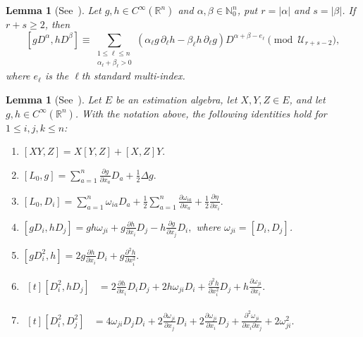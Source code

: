 \documentclass{tCON2e}
\newenvironment{revision}{\begingroup\color{black}}{\endgroup}
\numberwithin{equation}{section}
\theoremstyle{journalplain}
\newtheorem{lemma}[theorem]{Lemma}
\theoremstyle{journaldef}
\newenvironment{revision}{}{}
\begin{document}
\begin{revision}
\begin{lemma}[See~\citep{Wu2006Classification}]\label{lem:operator-products-symbols}
Let $g,h\in C^\infty(\mathbb R^n)$ and
$\alpha,\beta\in\mathbb N_0^n$, put $r=|\alpha|$ and $s=|\beta|$. If $r+s\geq2$, then
\[
[gD^\alpha,hD^\beta]
\equiv
\sum_{\substack{1\leq\ell\leq n\\
                 \alpha_\ell+\beta_\ell>0}}
\left(
\alpha_\ell g\,\partial_\ell h
-\beta_\ell h\,\partial_\ell g
\right)
D^{\alpha+\beta-e_\ell}
\pmod{\mathcal U_{r+s-2}},
\]
where $e_\ell$ is the $\ell$th standard multi-index.
\end{lemma}

\begin{lemma}[See~\citep{Yau1994FiniteDimensional,Chiou1994FiniteDimensional}]\label{lem:commutator-identities}
Let $E$ be an estimation algebra, let $X,Y,Z\in E$, and let
$g,h\in C^\infty(\mathbb R^n)$. With the notation above, the
following identities hold for $1\leq i,j,k\leq n$:
\begin{enumerate}
\renewcommand{\labelenumi}{(\arabic{enumi})}

\item
\(
[XY,Z]=X[Y,Z]+[X,Z]Y.
\)


\item
\(
\displaystyle
[L_0,g]
=
\sum_{a=1}^{n}\frac{\partial g}{\partial x_a}D_a
+\frac12\Delta g.
\)

\item
\(
\displaystyle
[L_0,D_i]
=
\sum_{a=1}^{n}\omega_{ia}D_a
+\frac12\sum_{a=1}^{n}
\frac{\partial\omega_{ia}}{\partial x_a}
+\frac12\frac{\partial\eta}{\partial x_i}.
\)


\item
\(
\displaystyle
[gD_i,hD_j]
=
gh\omega_{ji}
+g\frac{\partial h}{\partial x_i}D_j
-h\frac{\partial g}{\partial x_j}D_i,
\)
where $\omega_{ji}=[D_i,D_j]$.

\item
\(
\displaystyle
[gD_i^2,h]
=
2g\frac{\partial h}{\partial x_i}D_i
+g\frac{\partial^2h}{\partial x_i^2}.
\)

\item
\(
\begin{aligned}[t]
[D_i^2,hD_j]
&=
2\frac{\partial h}{\partial x_i}D_iD_j
+2h\omega_{ji}D_i
+\frac{\partial^2h}{\partial x_i^2}D_j
+h\frac{\partial\omega_{ji}}{\partial x_i}.
\end{aligned}
\)

\item
\(
\begin{aligned}[t]
[D_i^2,D_j^2]
&=
4\omega_{ji}D_jD_i
+2\frac{\partial\omega_{ji}}{\partial x_j}D_i
+2\frac{\partial\omega_{ji}}{\partial x_i}D_j
+\frac{\partial^2\omega_{ji}}{\partial x_i\partial x_j}
+2\omega_{ji}^2.
\end{aligned}
\)


\end{enumerate}
\end{lemma}
\end{revision}
\end{document}
